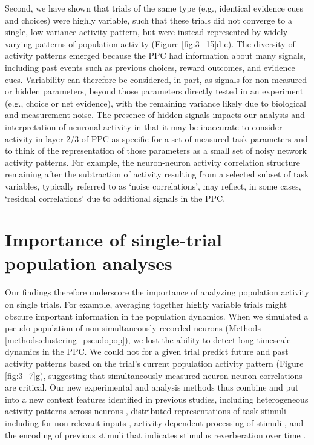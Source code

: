 \bigskip
Second, we have shown that trials of the same type (e.g., identical evidence cues and choices) were highly variable, such that these trials did not converge to a single, low-variance activity pattern, but were instead represented by widely varying patterns of population activity (Figure \ref{fig:3_15}d-e). The diversity of activity patterns emerged because the PPC had information about many signals, including past events such as previous choices, reward outcomes, and evidence cues. Variability can therefore be considered, in part, as signals for non-measured or hidden parameters, beyond those parameters directly tested in an experiment (e.g., choice or net evidence), with the remaining variance likely due to biological and measurement noise. The presence of hidden signals impacts our analysis and interpretation of neuronal activity in that it may be inaccurate to consider activity in layer 2/3 of PPC as specific for a set of measured task parameters and to think of the representation of those parameters as a small set of noisy network activity patterns. For example, the neuron-neuron activity correlation structure remaining after the subtraction of activity resulting from a selected subset of task variables, typically referred to as ‘noise correlations’, may reflect, in some cases, ‘residual correlations’ due to additional signals in the PPC.

\section{Importance of single-trial population analyses} \label{discussion:single_trial_importance}

Our findings therefore underscore the importance of analyzing population activity on single trials. For example, averaging together highly variable trials might obscure important information in the population dynamics. When we simulated a pseudo-population of non-simultaneously recorded neurons (Methods \ref{methods:clustering_pseudopop}), we lost the ability to detect long timescale dynamics in the PPC. We could not for a given trial predict future and past activity patterns based on the trial’s current population activity pattern (Figure \ref{fig:3_7}g), suggesting that simultaneously measured neuron-neuron correlations are critical. Our new experimental and analysis methods thus combine and put into a new context features identified in previous studies, including heterogeneous activity patterns across neurons \citep{Meister:2013ca, Park:2014co, Jun:2010kj, Raposo:2014df, Rigotti:2013bo}, distributed representations of task stimuli including for non-relevant inputs \citep{Mante:2013ie, Safaai:2013jq, Petersen:2000tw, Rigotti:2013bo}, activity-dependent processing of stimuli \citep{Harris:2011gw, Safaai:2015jr, Curto:2009ga}, and the encoding of previous stimuli that indicates stimulus reverberation over time \citep{Bernacchia:2011bb, Donahue:2015fi, Seo:2007jp, Seo:2007jv, Nikolic:2009cf, Klampfl:2012cm, Seo:2009jl, Sugrue:2004ex, Chaudhuri:2015jb, Murray:2014ee, Yang:2012hw}. 

